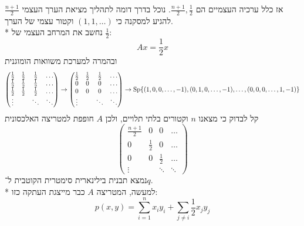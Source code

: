 אז כלל ערכיה העצמיים הם $\frac{n + 1}{2}, \frac{1}{2}$.
נוכל בדרך דומה לתהליך מציאת הערך העצמי $\frac{n + 1}{2}$ להגיע למסקנה כי $(1, 1, \hdots)$ וקטור עצמי של הערך. \\*
נחשב את המרחב העצמי של $\frac{1}{2}$:
\[
	A x = \frac{1}{2} x
\]
ובהמרה למערכת משוואות הומוגנית
\[
	\begin{pmatrix}
		\frac{1}{2} & \frac{1}{2} & \frac{1}{2} & \hdots \\
		\frac{1}{2} & \frac{1}{2} & \frac{1}{2} & \hdots \\
		\frac{1}{2} & \frac{1}{2} & \frac{1}{2} & \hdots \\
		\vdots & & \ddots & \ddots
	\end{pmatrix}
	\rightarrow
	\begin{pmatrix}
		\frac{1}{2} & \frac{1}{2} & \frac{1}{2} & \hdots \\
		0 & 0 & 0 & \hdots \\
		0 & 0 & 0 & \hdots \\
		\vdots & & \ddots & \ddots
	\end{pmatrix}
	\rightarrow
	\operatorname{Sp}\{ (1, 0, 0, \hdots, -1), (0, 1, 0, \hdots, -1), \hdots, (0, 0, 0, \hdots, 1, -1) \}
\]
קל לבדוק כי מצאנו $n$ וקטורים בלתי תלויים, ולכן $A$ חופפת למטריצה האלכסונית
\[
	\begin{pmatrix}
		\frac{n + 1}{2}  & 0 & 0 & \hdots \\
		0 & \frac{1}{2} & 0 & \hdots \\
		0 & 0 & \frac{1}{2} & \hdots \\
		\vdots & & \ddots & \ddots
	\end{pmatrix}
\]
נמצא תבנית בילינארית סימטרית הקוטבית ל־$q$. \\*
למעשה, המטריצה $A$ כבר מייצגת העתקה כזו:
\[
	p(x, y) = \sum_{i = 1}^n x_i y_i + \sum_{j \ne i} \frac{1}{2} x_j y_j
\]

